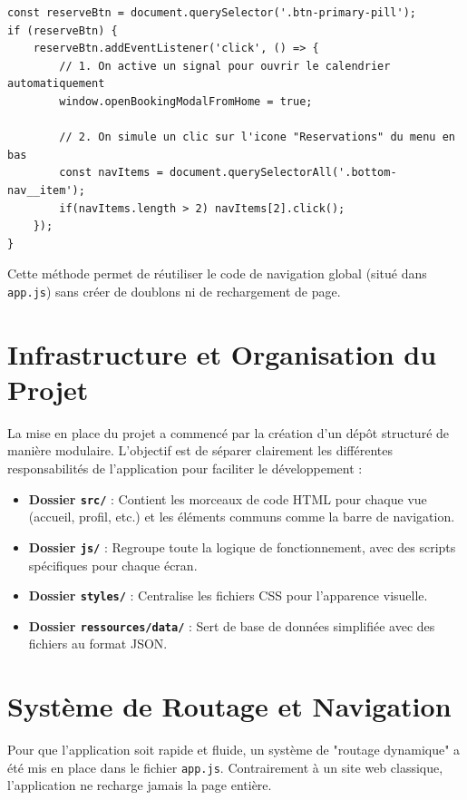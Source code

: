 \documentclass[12pt,a4paper]{article}
\begin{document}
\begin{lstlisting}[caption={Exemple de navigation simulee vers les reservations}]
const reserveBtn = document.querySelector('.btn-primary-pill');
if (reserveBtn) {
    reserveBtn.addEventListener('click', () => {
        // 1. On active un signal pour ouvrir le calendrier automatiquement
        window.openBookingModalFromHome = true;

        // 2. On simule un clic sur l'icone "Reservations" du menu en bas
        const navItems = document.querySelectorAll('.bottom-nav__item');
        if(navItems.length > 2) navItems[2].click();
    });
}
\end{lstlisting}
Cette méthode permet de réutiliser le code de navigation global (situé dans \texttt{app.js}) sans créer de doublons ni de rechargement de page.

\newpage

\section*{Infrastructure et Organisation du Projet}
La mise en place du projet a commencé par la création d'un dépôt structuré de manière modulaire. L'objectif est de séparer clairement les différentes responsabilités de l'application pour faciliter le développement :
\begin{itemize}
    \item \textbf{Dossier \texttt{src/}} : Contient les morceaux de code HTML pour chaque vue (accueil, profil, etc.) et les éléments communs comme la barre de navigation.
    \item \textbf{Dossier \texttt{js/}} : Regroupe toute la logique de fonctionnement, avec des scripts spécifiques pour chaque écran.
    \item \textbf{Dossier \texttt{styles/}} : Centralise les fichiers CSS pour l'apparence visuelle.
    \item \textbf{Dossier \texttt{ressources/data/}} : Sert de base de données simplifiée avec des fichiers au format JSON.
\end{itemize}

\section*{Système de Routage et Navigation}
Pour que l'application soit rapide et fluide, un système de "routage dynamique" a été mis en place dans le fichier \texttt{app.js}. Contrairement à un site web classique, l'application ne recharge jamais la page entière.
\end{document}
